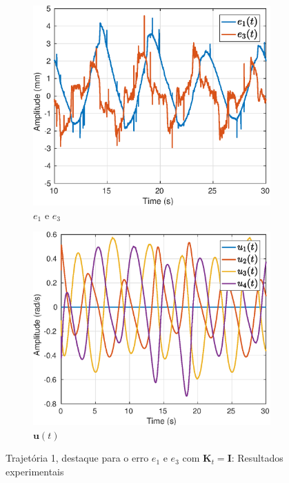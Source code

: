 \begin{figure}[H]
\centering
\begin{subfigure}{.5\textwidth}
  \centering
  \includegraphics[width=\linewidth]{./img/traj_1_k1/error.eps}
  \caption{$e_1$ e $e_3$}
  \label{fig:sub1}
\end{subfigure}%
\begin{subfigure}{.5\textwidth}
  \centering
  \includegraphics[width=\linewidth]{./img/traj_1_k1/u.eps}
  \caption{$\bm{u}(t)$}
  \label{fig:sub2}
\end{subfigure}
\caption{Trajetória 1, destaque para o erro $e_1$ e $e_3$ com $\bm{K}_t = \bm{I}$: Resultados experimentais}
\label{fig:erro_traj}
\end{figure}


